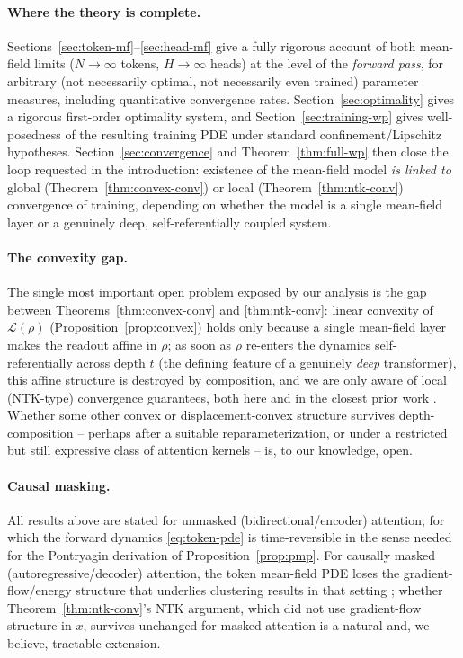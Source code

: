 \documentclass[11pt,a4wide]{article}
\theoremstyle{definition}
\begin{document}
\paragraph{Where the theory is complete.} Sections~\ref{sec:token-mf}--\ref{sec:head-mf} give a fully rigorous account of both mean-field limits ($N\to\infty$ tokens, $H\to\infty$ heads) at the level of the \emph{forward pass}, for arbitrary (not necessarily optimal, not necessarily even trained) parameter measures, including quantitative convergence rates. Section~\ref{sec:optimality} gives a rigorous first-order optimality system, and Section~\ref{sec:training-wp} gives well-posedness of the resulting training PDE under standard confinement/Lipschitz hypotheses. Section~\ref{sec:convergence} and Theorem~\ref{thm:full-wp} then close the loop requested in the introduction: existence of the mean-field model \emph{is linked to} global (Theorem~\ref{thm:convex-conv}) or local (Theorem~\ref{thm:ntk-conv}) convergence of training, depending on whether the model is a single mean-field layer or a genuinely deep, self-referentially coupled system.

\paragraph{The convexity gap.} The single most important open problem exposed by our analysis is the gap between Theorems~\ref{thm:convex-conv} and \ref{thm:ntk-conv}: linear convexity of $\mathcal L(\rho)$ (Proposition~\ref{prop:convex}) holds only because a single mean-field layer makes the readout affine in $\rho$; as soon as $\rho$ re-enters the dynamics self-referentially across depth $t$ (the defining feature of a genuinely \emph{deep} transformer), this affine structure is destroyed by composition, and we are only aware of local (NTK-type) convergence guarantees, both here and in the closest prior work \cite{barboni2026training}. Whether some other convex or displacement-convex structure survives depth-composition -- perhaps after a suitable reparameterization, or under a restricted but still expressive class of attention kernels -- is, to our knowledge, open.

\paragraph{Causal masking.} All results above are stated for unmasked (bidirectional/encoder) attention, for which the forward dynamics \eqref{eq:token-pde} is time-reversible in the sense needed for the Pontryagin derivation of Proposition~\ref{prop:pmp}. For causally masked (autoregressive/decoder) attention, the token mean-field PDE loses the gradient-flow/energy structure that underlies clustering results in that setting \cite{karagodin2024causal}; whether Theorem~\ref{thm:ntk-conv}'s NTK argument, which did not use gradient-flow structure in $x$, survives unchanged for masked attention is a natural and, we believe, tractable extension.
\end{document}
